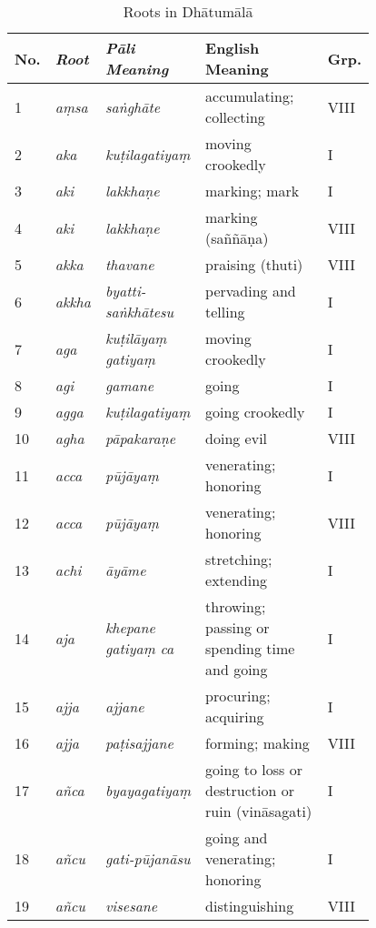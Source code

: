 \bigskip
\begin{spacing}{0.5}
\begin{longtable}[c]{@{}>{\raggedleft\arraybackslash\footnotesize}p{0.03\linewidth}%
	>{\raggedright\arraybackslash\itshape\footnotesize}p{0.12\linewidth}%
	>{\raggedright\arraybackslash\itshape\footnotesize}p{0.24\linewidth}%
	>{\raggedright\arraybackslash\footnotesize}p{0.35\linewidth}%
	>{\centering\arraybackslash\footnotesize}p{0.05\linewidth}}
\caption{Roots in Dh\=atum\=al\=a}\label{tab:roots}\\
\toprule
\bfseries No. & \bfseries\upshape Root & \bfseries\upshape P\=ali Meaning & \bfseries English Meaning & \bfseries Grp. \\ \midrule
\endfirsthead
\endhead
\endfoot
\bottomrule
\endlastfoot
%
1 & a\d msa & sa\.ngh\=ate & accumulating; collecting & VIII \\
2 & aka & ku\d tilagatiya\d m & moving crookedly & I \\
3 & aki & lakkha\d ne & marking; mark & I \\
4 & aki & lakkha\d ne & marking (sa\~n\~n\=a\d na) & VIII \\
5 & akka & thavane & praising (thuti) & VIII \\
6 & akkha & byatti-sa\.nkh\=atesu & pervading and telling & I \\
7 & aga & ku\d til\=aya\d m gatiya\d m & moving crookedly & I \\
8 & agi & gamane & going & I \\
9 & agga & ku\d tilagatiya\d m & going crookedly & I \\
10 & agha & p\=apakara\d ne & doing evil & VIII \\
11 & acca & p\=uj\=aya\d m & venerating; honoring & I \\
12 & acca & p\=uj\=aya\d m & venerating; honoring & VIII \\
13 & achi & \=ay\=ame & stretching; extending & I \\
14 & aja & khepane gatiya\d m ca & throwing; passing or spending time and going & I \\
15 & ajja & ajjane & procuring; acquiring & I \\
16 & ajja & pa\d tisajjane & forming; making & VIII \\
17 & a\~nca & byayagatiya\d m & going to loss or destruction or ruin (vin\=asagati) & I \\
18 & a\~ncu & gati-p\=ujan\=asu & going and venerating; honoring & I \\
19 & a\~ncu & visesane & distinguishing & VIII \\

\end{longtable}
\end{spacing}
